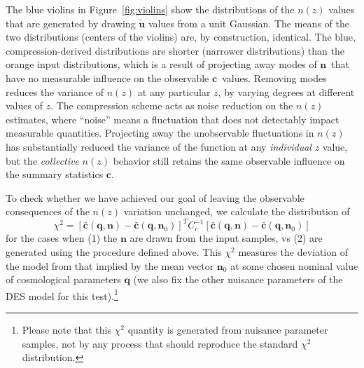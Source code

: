 \documentclass[onecolumn,resetfootnote]{aastex7}
\newcommand{\vecc}{\ensuremath{\mathbf{c}}}
\newcommand{\vecq}{\ensuremath{\mathbf{q}}}
\newcommand{\vecn}{\ensuremath{\mathbf{n}}}
\newcommand{\vecu}{\ensuremath{\mathbf{u}}}
\newcommand{\hatc}{\ensuremath{\bar{\mathbf{c}}}}
\newcommand{\covm}{C}
\begin{document}
The blue violins in Figure~\ref{fig:violins} show the distributions
of the $n(z)$ values that are generated by drawing $\widetilde{\vecu}$
values from a unit Gaussian.
The means of the two distributions (centers of the violins)
  are, by construction, identical.  The blue, compression-derived distributions
  are shorter (narrower distributions) than the orange input distributions,
  which is a result of projecting away modes of \vecn\ that have no measurable influence on the
  observable \vecc\ values.  Removing modes reduces the variance of $n(z)$ at any
  particular $z$, by varying degrees at different values of $z.$ The compression
scheme acts as noise reduction on the $n(z)$ estimates, where ``noise'' means a
fluctuation that does not detectably impact measurable quantities.
Projecting away the
unobservable fluctuations in $n(z)$ has substantially reduced the
variance of the function at any \emph{individual} $z$ value, but the
\emph{collective} $n(z)$ behavior still retains the same observable influence on
the summary statistics $\vecc$.

To check whether we have achieved our goal
of leaving the observable consequences of the $n(z)$ variation
unchanged, we calculate the distribution of
\begin{equation}
  \chi^2 =  \left[\hatc(\vecq,\vecn) - \hatc(\vecq,\vecn_0) \right]^T
                                           \covm_c^{-1}  \left[ \hatc(\vecq,\vecn) - \hatc(\vecq,\vecn_0)\right]
\label{eq:chihist}
\end{equation}
for the cases when (1) the $\vecn$ are drawn from the input samples, vs
(2) are generated using the procedure defined above.  This $\chi^2$
measures the deviation of the model from that implied by the mean
vector $\vecn_0$ at some chosen nominal value of cosmological
parameters $\vecq$ (we also fix the other nuisance parameters of the
DES model for this test).\footnote{Please note that this $\chi^2$ quantity
    is generated from nuisance parameter samples, not by any process that should
    reproduce the standard $\chi^2$ distribution.}
\end{document}
